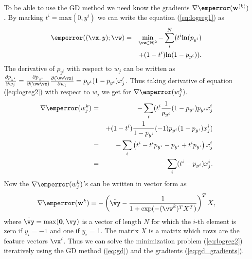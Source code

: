 \documentclass[aps,prb,10pt,twocolumn,groupedaddress]{revtex4-1}
\begin{document}
To be able to use the GD method we need know the gradients  $\nabla \emperror(\mathbf{w}^{(k)})$.
By marking $t^i=\mathrm{max}(0,y^i)$ we can write the equation (\ref{eq:logreg1}) as
\begin{eqnarray}
  \emperror((\vx,y);\vw)&=&\min\limits_{\vw \in \mathbf{R}^{2}}-\sum_i^N(t^i\mathrm{ln}(p_{y^i})\nonumber\\
  & &+(1-t^i)\mathrm{ln}(1-p_{y^i})).
  \label{eq:logreg2}
\end{eqnarray}
The derivative of $p_{y^i}$ with respect to $w_j$ can be written as $\frac{\partial p_{y^i}}{\partial w_j}=\frac{\partial p_{y^i}}{\partial (\vw\vx)}\frac{\partial (\vw\vx)}{\partial w_j} = p_{y^i}(1-p_{y^i})x_j^i$. Thus taking derivative of equation (\ref{eq:logreg2}) with
respect to $w_j$ we get for $\nabla \emperror(w_j^k)$.
\begin{eqnarray}
  \nabla \emperror(w_j^k) &=&-\sum_i(t^i\frac{1}{p_{y^i}}(1-p_{y^i})p_{y^i}x_j^i\nonumber\\
  & &+(1-t^i)\frac{1}{1-p_{y^i}}(-1)p_{y^i}(1-p_{y^i})x_j^i)\nonumber\\
  &=&-\sum_i\left(t^i -t^ip_{y^i}-p_{y^i}+t^ip_{y^i}\right)x_j^i\nonumber\\
  &=&-\sum_i(t^i-p_{y^i})x_j^i.
\end{eqnarray}
Now the $\nabla \emperror(w_j^k)$'s can be written in vector form as
\begin{equation}
  \nabla \emperror(\mathbf{w}^k) = -\left(\hat{\vy}-\frac{1}{1+\mathrm{exp}(-(\vw^{k})^T X^T)}\right)^TX,
  \label{eq:gd_gradients}
\end{equation}
where $\hat{\vy} = \mathrm{max}(\mathbf{0},\vy)$ is a vector of length $N$ for which the
$i$-th element is zero if $y_i=-1$ and one if $y_i$ = 1. The matrix $X$ is a
matrix which rows are the feature vectors $\vx^i$. Thus we can solve the minimization
problem (\ref{eq:logreg2}) iteratively using the GD method (\ref{eq:gd}) and the gradients (\ref{eq:gd_gradients}).
\end{document}
